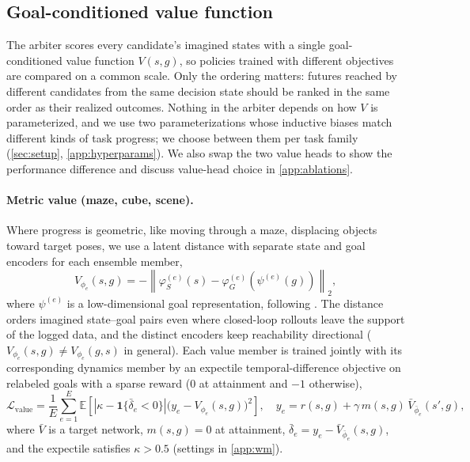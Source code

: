 \documentclass{article}
\theoremstyle{plain}
\theoremstyle{definition}
\theoremstyle{plain}
\newcommand{\E}{\mathbb{E}}
\begin{document}
\subsection{Goal-conditioned value function}
\label{sec:value}

The arbiter scores every candidate's imagined states with a single goal-conditioned value function $V(s,g)$, so policies trained with different objectives are compared on a common scale. Only the ordering matters: futures reached by different candidates from the same decision state should be ranked in the same order as their realized outcomes. Nothing in the arbiter depends on how $V$ is parameterized, and we use two parameterizations whose inductive biases match different kinds of task progress; we choose between them per task family (\cref{sec:setup}, \cref{app:hyperparams}). We also swap the two value heads to show the performance difference and discuss value-head choice in \cref{app:ablations}.

\paragraph{Metric value (maze, cube, scene).} Where progress is geometric, like moving through a maze, displacing objects toward target poses, we use a latent distance with separate state and goal encoders for each ensemble member,
\begin{equation}
V_{\phi_e}(s,g)
= -\left\|\varphi^{(e)}_{S}(s)-\varphi^{(e)}_{G}(\psi^{(e)}(g))\right\|_2,
\label{eq:metric-value}
\end{equation}
where $\psi^{(e)}$ is a low-dimensional goal representation, following \citet{kang2026lavl}. The distance orders imagined state--goal pairs even where closed-loop rollouts leave the support of the logged data, and the distinct encoders keep reachability directional ($V_{\phi_e}(s,g)\neq V_{\phi_e}(g,s)$ in general). Each value member is trained jointly with its corresponding dynamics member by an expectile temporal-difference objective on relabeled goals with a sparse reward ($0$ at attainment and $-1$ otherwise),
\begin{equation}
\mathcal{L}_{\mathrm{value}}
= \frac{1}{E}\sum_{e=1}^{E}
\E\!\left[
\left|\kappa-\mathbf{1}\{\bar\delta_e<0\}\right|
\big(y_e-V_{\phi_e}(s,g)\big)^2
\right],
\quad
y_e = r(s,g)+\gamma\,m(s,g)\,
\bar V_{\bar\phi_e}(s',g),
\label{eq:expectile}
\end{equation}
where $\bar V$ is a target network, $m(s,g)=0$ at attainment, $\bar\delta_e=y_e-\bar V_{\bar\phi_e}(s,g)$, and the expectile satisfies $\kappa>0.5$ (settings in \cref{app:wm}).
\end{document}

